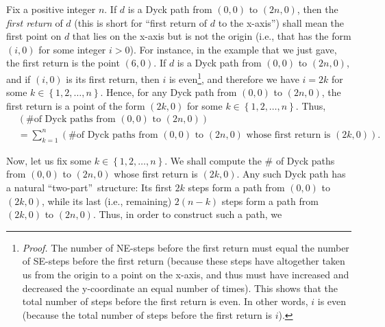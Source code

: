 Fix a positive integer $n$. If $d$ is a Dyck path from $\left(  0,0\right)  $
to $\left(  2n,0\right)  $, then the \emph{first return} of $d$ (this is short
for \textquotedblleft first return of $d$ to the x-axis\textquotedblright)
shall mean the first point on $d$ that lies on the x-axis but is not the
origin (i.e., that has the form $\left(  i,0\right)  $ for some integer
$i>0$). For instance, in the example that we just gave, the first return is
the point $\left(  6,0\right)  $. If $d$ is a Dyck path from $\left(
0,0\right)  $ to $\left(  2n,0\right)  $, and if $\left(  i,0\right)  $ is its
first return, then $i$ is even\footnote{\textit{Proof.} The number of NE-steps
before the first return must equal the number of SE-steps before the first
return (because these steps have altogether taken us from the origin to a
point on the x-axis, and thus must have increased and decreased the
y-coordinate an equal number of times). This shows that the total number of
steps before the first return is even. In other words, $i$ is even (because
the total number of steps before the first return is $i$).}, and therefore we
have $i=2k$ for some $k\in\left\{  1,2,\ldots,n\right\}  $. Hence, for any
Dyck path from $\left(  0,0\right)  $ to $\left(  2n,0\right)  $, the first
return is a point of the form $\left(  2k,0\right)  $ for some $k\in\left\{
1,2,\ldots,n\right\}  $. Thus,%
\begin{align*}
&  \left(  \text{\# of Dyck paths from }\left(  0,0\right)  \text{ to }\left(
2n,0\right)  \right)  \\
&  =\sum_{k=1}^{n}\left(  \text{\# of Dyck paths from }\left(  0,0\right)
\text{ to }\left(  2n,0\right)  \text{ whose first return is }\left(
2k,0\right)  \right)  .
\end{align*}


Now, let us fix some $k\in\left\{  1,2,\ldots,n\right\}  $. We shall compute
the \# of Dyck paths from $\left(  0,0\right)  $ to $\left(  2n,0\right)  $
whose first return is $\left(  2k,0\right)  $. Any such Dyck path has a
natural \textquotedblleft two-part\textquotedblright\ structure: Its first
$2k$ steps form a path from $\left(  0,0\right)  $ to $\left(  2k,0\right)  $,
while its last (i.e., remaining) $2\left(  n-k\right)  $ steps form a path
from $\left(  2k,0\right)  $ to $\left(  2n,0\right)  $. Thus, in order to
construct such a path, we

